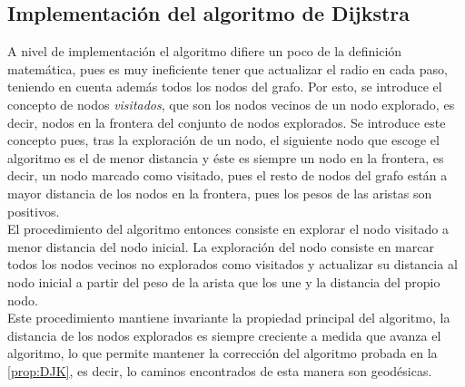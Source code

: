 \subsection{Implementación del algoritmo de Dijkstra}

A nivel de implementación el algoritmo difiere un poco de la definición matemática, pues es muy ineficiente tener que actualizar el radio en cada paso, teniendo en cuenta además todos los nodos del grafo. Por esto, se introduce el concepto de nodos \textit{visitados}, que son los nodos vecinos de un nodo explorado, es decir, nodos en la frontera del conjunto de nodos explorados. Se introduce este concepto pues, tras la exploración de un nodo, el siguiente nodo que escoge el algoritmo es el de menor distancia y éste es siempre un nodo en la frontera, es decir, un nodo marcado como visitado, pues el resto de nodos del grafo están a mayor distancia de los nodos en la frontera, pues los pesos de las aristas son positivos. \\

El procedimiento del algoritmo entonces consiste en explorar el nodo visitado a menor distancia del nodo inicial. La exploración del nodo consiste en marcar todos los nodos vecinos no explorados como visitados y actualizar su distancia al nodo inicial a partir del peso de la arista que los une y la distancia del propio nodo. \\

Este procedimiento mantiene invariante la propiedad principal del algoritmo, la distancia de los nodos explorados es siempre creciente a medida que avanza el algoritmo, lo que permite mantener la corrección del algoritmo probada en la \autoref{prop:DJK}, es decir, lo caminos encontrados de esta manera son geodésicas. \\

